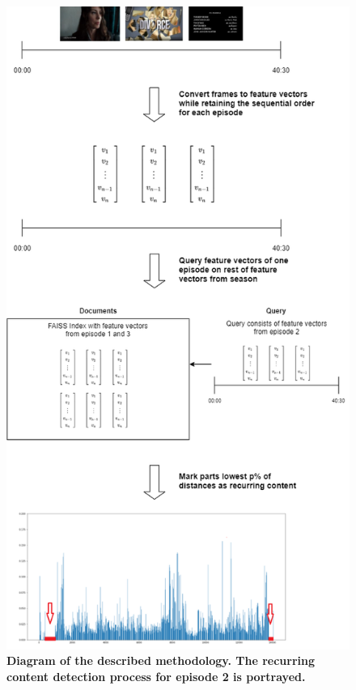 \documentclass{article}
\begin{document}
\begin{figure}[H]
	\includegraphics[width=\textwidth, center, scale=0.75]{images/thesisdiagram.png}
	\centering
	\caption{\textbf{Diagram of the described methodology. The recurring content detection process for episode 2 is portrayed.}}
	\label{fig:diagram}
\end{figure}
\end{document}
